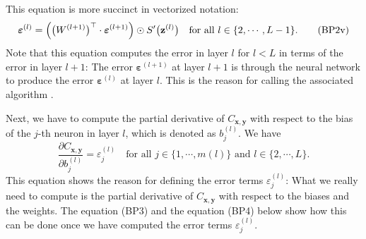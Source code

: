 This equation is more succinct in vectorized notation:
\begin{equation}
  \label{eq:BP2v}
  \boldsymbol{\varepsilon}^{(l)} = \Bigl(\bigl(W^{(l+1)}\bigr)^\top \cdot \boldsymbol{\varepsilon}^{(l+1)}\Bigr) \odot
  S'\bigl(\mathbf{z}^{(l)}\bigr) \quad \mbox{for all $l \in \{2, \cdots, L-1\}$}.
  \tag{BP2v}
\end{equation}
Note that this equation computes the error in layer $l$ for $l < L$ in terms
of the error in layer $l+1$:  The error 
$\boldsymbol{\varepsilon}^{(l+1)}$ at layer $l+1$ is  through the neural network to produce the
error $\boldsymbol{\varepsilon}^{(l)}$ at layer $l$.  This is the reason for calling the associated algorithm
.  


Next, we have to compute the partial derivative of $C_{\mathbf{x}, \mathbf{y}}$ with respect to the bias of the
$j$-th neuron in layer $l$, which is denoted as $b_j^{(l)}$.  We have
\begin{equation}
  \label{eq:BP3}
  \frac{\partial C_{\mathbf{x}, \mathbf{y}}}{\partial b_j^{(l)}} = \varepsilon_j^{(l)}
  \quad \mbox{for all $j \in \{1,\cdots,m(l)\}$ and $l \in \{2, \cdots,L\}$.}
  \tag{BP3}
\end{equation}
This equation shows the reason for defining the error terms $\varepsilon_j^{(l)}$:  What we really need to
compute is the partial derivative of $C_{\mathbf{x},\mathbf{y}}$ with respect to the biases and the weights.
The equation (BP3) and the equation (BP4) below show how this can be done once we have computed the error terms
$\varepsilon_j^{(l)}$.

